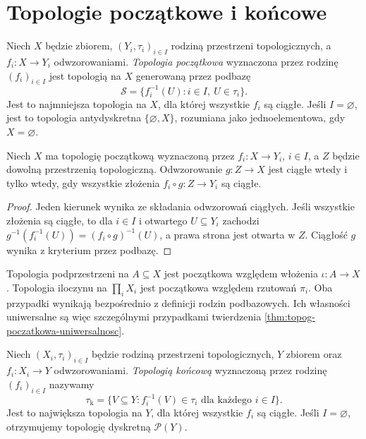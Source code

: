 \section{Topologie początkowe i końcowe}
\label{sec:topog-topologie-poczatkowe-koncowe}

\begin{definicja}
\label{def:topog-topologia-poczatkowa}
Niech $X$ będzie zbiorem, $(Y_i,\tau_i)_{i\in I}$ rodziną
przestrzeni topologicznych, a $f_i\colon X\to Y_i$
odwzorowaniami. \emph{Topologia początkowa} wyznaczona
przez rodzinę $(f_i)_{i\in I}$ jest topologią na $X$
generowaną przez podbazę
\[
\mathcal S=\{f_i^{-1}(U):i\in I,\ U\in\tau_i\}.
\]
Jest to najmniejsza topologia na $X$, dla której wszystkie
$f_i$ są ciągłe. Jeśli $I=\varnothing$, jest to
topologia antydyskretna $\{\varnothing,X\}$,
rozumiana jako jednoelementowa, gdy $X=\varnothing$.
\end{definicja}

\begin{twierdzenie}
\label{thm:topog-poczatkowa-uniwersalnosc}
Niech $X$ ma topologię początkową wyznaczoną przez
$f_i\colon X\to Y_i$, $i\in I$, a $Z$ będzie dowolną
przestrzenią topologiczną. Odwzorowanie $g\colon Z\to X$
jest ciągłe wtedy i tylko wtedy, gdy wszystkie złożenia
$f_i\circ g\colon Z\to Y_i$ są ciągłe.
\end{twierdzenie}
\begin{proof}
Jeden kierunek wynika ze składania odwzorowań ciągłych.
Jeśli wszystkie złożenia są ciągłe, to dla $i\in I$
i otwartego $U\subseteq Y_i$ zachodzi
$g^{-1}(f_i^{-1}(U))=(f_i\circ g)^{-1}(U)$,
a prawa strona jest otwarta w $Z$.
Ciągłość $g$ wynika z kryterium przez podbazę.
\end{proof}

\begin{uwaga}
Topologia podprzestrzeni na $A\subseteq X$ jest początkowa
względem włożenia $\iota\colon A\to X$. Topologia iloczynu
na $\prod_i X_i$ jest początkowa względem rzutowań $\pi_i$.
Oba przypadki wynikają bezpośrednio z definicji rodzin
podbazowych. Ich własności uniwersalne są więc
szczególnymi przypadkami twierdzenia
\ref{thm:topog-poczatkowa-uniwersalnosc}.
\end{uwaga}

\begin{definicja}
\label{def:topog-topologia-koncowa}
Niech $(X_i,\tau_i)_{i\in I}$ będzie rodziną przestrzeni
topologicznych, $Y$ zbiorem oraz
$f_i\colon X_i\to Y$ odwzorowaniami. \emph{Topologią końcową}
wyznaczoną przez rodzinę $(f_i)_{i\in I}$ nazywamy
\[
\tau_{\mathrm k}=\{V\subseteq Y:
 f_i^{-1}(V)\in\tau_i\text{ dla każdego }i\in I\}.
\]
Jest to największa topologia na $Y$, dla której wszystkie
$f_i$ są ciągłe. Jeśli $I=\varnothing$, otrzymujemy
topologię dyskretną $\mathcal P(Y)$.
\end{definicja}

